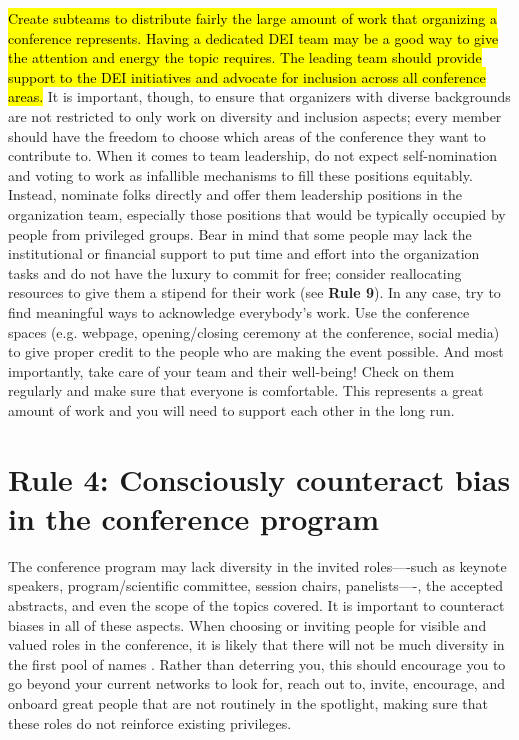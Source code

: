 \documentclass[10pt,letterpaper]{article}
\begin{document}
 \hl{Create subteams to distribute fairly the large amount of work that organizing a conference represents. 
Having a dedicated DEI team may be a good way to give the attention and energy the topic requires.
The leading team should provide support to the DEI initiatives and advocate for inclusion across all conference areas.}  
It is important, though, to ensure that organizers with diverse backgrounds are not restricted to only work on diversity and inclusion aspects; 
every member should have the freedom to choose which areas of the conference they want to contribute to.
When it comes to team leadership, do not expect self-nomination and voting to work as infallible mechanisms to fill these positions equitably. 
Instead, nominate folks directly and offer them leadership positions in the organization team, especially those positions that would be typically occupied by people from privileged groups.
Bear in mind that some people may lack the institutional or financial support to put time and effort into the organization tasks and do not have the luxury to commit for free; consider reallocating resources to give them a stipend for their work (see \textbf{Rule 9}).
In any case, try to find meaningful ways to acknowledge everybody's work. Use the conference spaces (e.g. webpage, opening/closing ceremony at the conference, social media) to give proper credit to the people who are making the event possible.
And most importantly, take care of your team and their well-being! Check on them regularly and make sure that everyone is comfortable. This represents a great amount of work and you will need to support each other in the long run.


\section*{Rule 4: Consciously counteract bias in the conference program}
\label{rule_unbias}

The conference program may lack diversity in the invited roles––-such as keynote speakers, program/scientific committee, session chairs, panelists––-, the accepted abstracts, and even the scope of the topics covered. 
It is important to counteract biases in all of these aspects.
When choosing or inviting people for visible and valued roles in the conference, it is likely that there will not be much diversity in the first pool of names \cite{dwyerNoticeWhoScience2021,swartzScienceValueDiversity2019,wongBuildDiversityScience2020,dignazioUnicornsJanitorsNinjas2020}. 
Rather than deterring you, this should encourage you to go beyond your current networks to look for, reach out to, invite, encourage, and onboard great people that are not routinely in the spotlight, making sure that these roles do not reinforce existing privileges.
\end{document}
